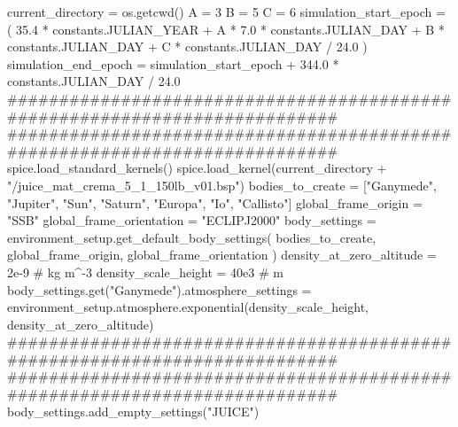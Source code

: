 {}
\markdownRendererSectionEnd \markdownRendererSectionBegin
{}\markdownRendererInterblockSeparator
{}current_directory = os.getcwd()\markdownRendererInterblockSeparator
{}
\markdownRendererSectionEnd \markdownRendererSectionBegin
{}\markdownRendererInterblockSeparator
{}A = 3 B = 5 C = 6 simulation_start_epoch = ( 35.4 * constants.JULIAN_YEAR + A * 7.0 * constants.JULIAN_DAY + B * constants.JULIAN_DAY + C * constants.JULIAN_DAY / 24.0 ) simulation_end_epoch = simulation_start_epoch + 344.0 * constants.JULIAN_DAY / 24.0\markdownRendererInterblockSeparator
{}###########################################################################\markdownRendererInterblockSeparator
{}
\markdownRendererSectionEnd \markdownRendererSectionBegin
{}\markdownRendererInterblockSeparator
{}###########################################################################\markdownRendererInterblockSeparator
{}
\markdownRendererSectionEnd \markdownRendererSectionBegin
{}\markdownRendererInterblockSeparator
{}spice.load_standard_kernels() spice.load_kernel(current_directory + "/juice_mat_crema_5_1_150lb_v01.bsp")\markdownRendererInterblockSeparator
{}
\markdownRendererSectionEnd \markdownRendererSectionBegin
{}\markdownRendererInterblockSeparator
{}bodies_to_create = ["Ganymede", "Jupiter", "Sun", "Saturn", "Europa", "Io", "Callisto"] global_frame_origin = "SSB" global_frame_orientation = "ECLIPJ2000" body_settings = environment_setup.get_default_body_settings( bodies_to_create, global_frame_origin, global_frame_orientation )\markdownRendererInterblockSeparator
{}
\markdownRendererSectionEnd \markdownRendererSectionBegin
{}\markdownRendererInterblockSeparator
{}density_at_zero_altitude = 2e-9 # kg m^-3 density_scale_height = 40e3 # m body_settings.get("Ganymede").atmosphere_settings = environment_setup.atmosphere.exponential(density_scale_height, density_at_zero_altitude)\markdownRendererInterblockSeparator
{}###########################################################################\markdownRendererInterblockSeparator
{}
\markdownRendererSectionEnd \markdownRendererSectionBegin
{}\markdownRendererInterblockSeparator
{}########################################################################### body_settings.add_empty_settings("JUICE")\markdownRendererInterblockSeparator
